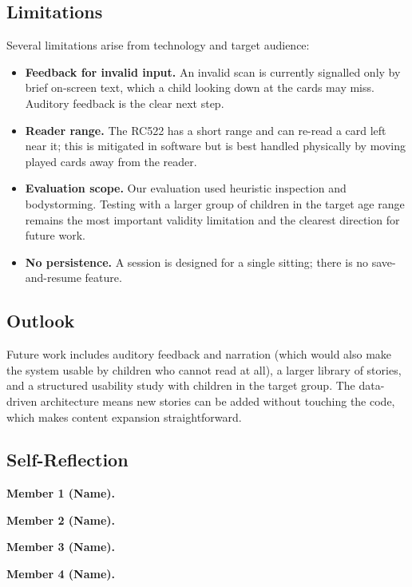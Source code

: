 \subsection{Limitations}
Several limitations arise from technology and target audience:
\begin{itemize}
  \item \textbf{Feedback for invalid input.} An invalid scan is currently
        signalled only by brief on-screen text, which a child looking down at
        the cards may miss. Auditory feedback is the clear next step.
  \item \textbf{Reader range.} The RC522 has a short range and can re-read a
        card left near it; this is mitigated in software but is best handled
        physically by moving played cards away from the reader.
  \item \textbf{Evaluation scope.} Our evaluation used heuristic inspection
        and bodystorming. Testing with a larger group of children in the
        target age range remains the most important validity limitation and
        the clearest direction for future work.
  \item \textbf{No persistence.} A session is designed for a single sitting;
        there is no save-and-resume feature.
\end{itemize}

\subsection{Outlook}
Future work includes auditory feedback and narration (which would also make
the system usable by children who cannot read at all), a larger library of
stories, and a structured usability study with children in the target group.
The data-driven architecture means new stories can be added without touching
the code, which makes content expansion straightforward.

\subsection{Self-Reflection}

\textbf{Member 1 (Name).}

\textbf{Member 2 (Name).}
%

\textbf{Member 3 (Name).}
%

\textbf{Member 4 (Name).}
%

\printbibliography[title={Bibliography}]


